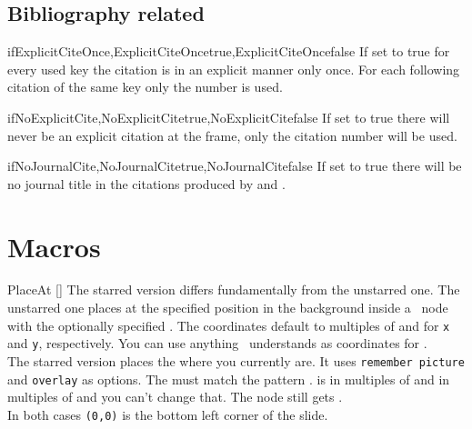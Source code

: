 \subsection{Bibliography related}
\begin{describemacro}
  {ifExplicitCiteOnce,ExplicitCiteOncetrue,ExplicitCiteOncefalse}%
  If set to true for every used key the citation is in an explicit manner only
  once. For each following citation of the same key only the number is used.
\end{describemacro}

\begin{describemacro}{ifNoExplicitCite,NoExplicitCitetrue,NoExplicitCitefalse}
  If set to true there will never be an explicit citation at the frame, only the
  citation number will be used.
\end{describemacro}

\begin{describemacro}{ifNoJournalCite,NoJournalCitetrue,NoJournalCitefalse}
  If set to true there will be no journal title in the citations produced by
   and .
\end{describemacro}

\section{Macros}\label{sec:beam:macros}
\begin{describemacro}{PlaceAt}%
  [\meta{*}]
  The starred version differs fundamentally from the unstarred one. The
  unstarred one places  at the specified position  in
  the background inside a \TikZ\ node with the optionally specified . The coordinates default to multiples of  and
   for \texttt{x} and \texttt{y}, respectively. You can use
  anything \TikZ\ understands as coordinates for .\\[\parskip]
  The starred version places the  where you currently are. It
  uses \texttt{remember picture} and \texttt{overlay} as options. The 
  must match the pattern .  is in multiples of 
  and  in multiples of  and you can't change that. The
  node still gets .\\[\parskip]
  In both cases \texttt{(0,0)} is the bottom left corner of the slide.
\end{describemacro}

